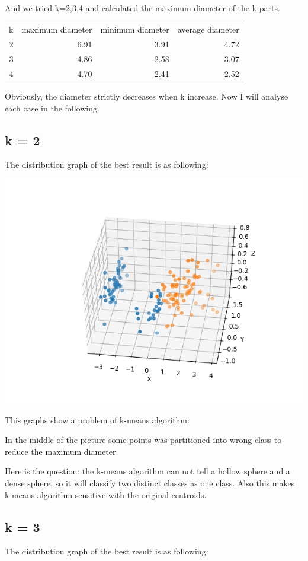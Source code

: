 \documentclass[11pt]{article}
\begin{document}
And we tried k=2,3,4 and calculated the maximum diameter of the k parts.

\begin{center}
\begin{tabular}{rrrr}
k & maximum diameter & minimum diameter & average diameter\\
2 & 6.91 & 3.91 & 4.72\\
3 & 4.86 & 2.58 & 3.07\\
4 & 4.70 & 2.41 & 2.52\\
\end{tabular}
\end{center}

Obviously, the diameter strictly decreases when k increase.
Now I will analyse each case in the following.

\subsection{k = 2}
\label{sec-2-1}
The distribution graph of the best result is as following:

\includegraphics[width=.9\linewidth]{cluster=2.png}

This graphs show a problem of k-means algorithm:

In the middle of the picture some points was partitioned into wrong
class to reduce the maximum diameter.

Here is the question: the k-means algorithm can not tell a hollow sphere
and a dense sphere, so it will classify two distinct classes as one class.
Also this makes k-means algorithm sensitive with the original centroids.

\subsection{k = 3}
\label{sec-2-2}
The distribution graph of the best result is as following:
\end{document}
